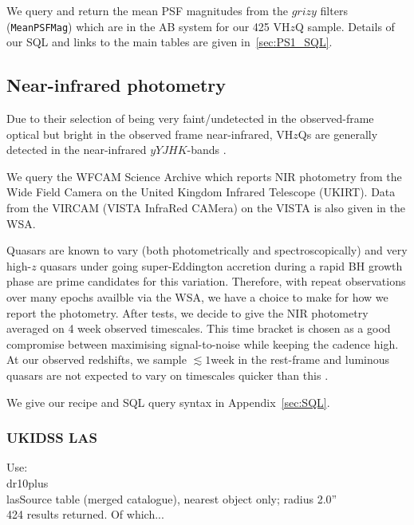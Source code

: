 \documentclass[usenatbib]{mnras}
\begin{document}
We query and return the mean PSF magnitudes from the $grizy$ filters
({\tt MeanPSFMag}) which are in the AB system for our 425 VH$z$Q
sample. Details of our SQL and links to the main tables are given
in~\ref{sec:PS1_SQL}.


\subsection{Near-infrared photometry}
Due to their selection of being very faint/undetected in the
observed-frame optical but bright in the observed frame near-infrared,
VH$z$Qs are generally detected in the near-infrared $yYJHK$-bands
\citep[$\approx$0.98-2.38$\mu$m; e.g., ][]{Peth2011}.

We query the WFCAM Science Archive
\citep[\href{http://wsa.roe.ac.uk/}{WSA}; ][]{Hambly2008} which
reports NIR photometry from the Wide Field Camera \citep[WFCAM;
][]{Casali2007} on the United Kingdom Infrared Telescope (UKIRT).
Data from the VIRCAM (VISTA InfraRed CAMera) on the VISTA
\citep[Visible and Infrared Survey Telescope for Astronomy;
][]{Emerson2006, Dalton2006} is also given in the WSA.

Quasars are known to vary (both photometrically and spectroscopically)
and very high-$z$ quasars under going super-Eddington accretion during
a rapid BH growth phase are prime candidates for this variation.
Therefore, with repeat observations over many epochs availble via the
WSA, we have a choice to make for how we report the photometry. After
tests, we decide to give the NIR photometry averaged on 4 week
observed timescales. This time bracket is chosen as a good compromise
between maximising signal-to-noise while keeping the cadence high. At
our observed redshifts, we sample $\lesssim1$week in the rest-frame
and luminous quasars are not expected to vary on timescales quicker
than this \citep[e.g., ][]{Lawrence2016_ASPC}. 
 
We give our recipe and SQL query syntax in Appendix~\ref{sec:SQL}.

\subsubsection{UKIDSS LAS} 
Use:\\
dr10plus\\
lasSource table (merged catalogue), nearest object only; radius 2.0'' \\
424 results returned. Of which...
\end{document}
